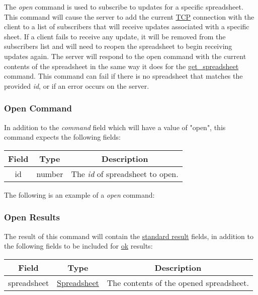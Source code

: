 The \emph{open} command is used to subscribe to updates for a specific spreadsheet. 
This command will cause the server to add the current \href{https://en.wikipedia.org/wiki/Transmission_Control_Protocol}{TCP} 
connection with the client to a list of subscribers that will receive updates 
associated with a specific sheet. If a client fails to receive any update, it 
will be removed from the subscribers list and will need to reopen the 
spreadsheet to begin receiving updates again. The server will respond to the 
open command with the current contents of the spreadsheet in the same way it 
does for the \hyperref[sec:message:get_spreadsheet]{get\_spreadsheet} command. 
This command can fail if there is no spreadsheet that matches the provided \emph{id}, 
or if an error occurs on the server.

\subsubsection{Open Command}
In addition to the \emph{command} field which will have a value of "open", this command expects the following fields:
\begin{table}[H]
    \begin{center}
        \begin{tabular}{|c|c|c|}\hline
            Field & Type & Description \\\hline
            id & number & The \emph{id} of spreadsheet to open. \\\hline
        \end{tabular}
    \end{center}
\end{table}

The following is an example of a \emph{open} command:


\subsubsection{Open Results}
The result of this command will contain the \hyperref[sec:message:result]{standard result} fields, in addition to the following fields to be included for \underline{ok} results:
\begin{table}[H]
    \begin{center}
        \begin{tabular}{|c|c|c|}\hline
            Field & Type & Description \\\hline
            spreadsheet & \hyperref[sec:message:spreadsheet]{Spreadsheet} & The contents of the opened spreadsheet. \\\hline
        \end{tabular}
    \end{center}
\end{table}

